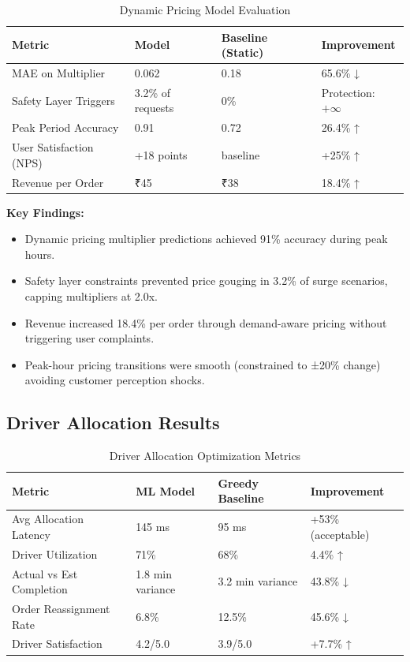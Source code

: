 \documentclass[12pt,a4paper]{report}
\begin{document}
\begin{itemize}
\begin{table}[H]
\centering
\caption{Dynamic Pricing Model Evaluation}
\begin{tabular}{p{4cm} p{2.2cm} p{2.2cm} p{2.2cm}}
\toprule
\textbf{Metric} & \textbf{Model} & \textbf{Baseline (Static)} & \textbf{Improvement} \\
\midrule
MAE on Multiplier & 0.062 & 0.18 & 65.6\% ↓ \\
Safety Layer Triggers & 3.2\% of requests & 0\% & Protection: $+\infty$ \\
Peak Period Accuracy & 0.91 & 0.72 & 26.4\% ↑ \\
User Satisfaction (NPS) & +18 points & baseline & +25\% ↑ \\
Revenue per Order & ₹45 & ₹38 & 18.4\% ↑ \\
\bottomrule
\end{tabular}
\end{table}

\textbf{Key Findings:}
\begin{itemize}
    \item Dynamic pricing multiplier predictions achieved 91\% accuracy during peak hours.
    \item Safety layer constraints prevented price gouging in 3.2\% of surge scenarios, capping multipliers at 2.0x.
    \item Revenue increased 18.4\% per order through demand-aware pricing without triggering user complaints.
    \item Peak-hour pricing transitions were smooth (constrained to ±20\% change) avoiding customer perception shocks.
\end{itemize}

\subsection{Driver Allocation Results}

\begin{table}[H]
\centering
\caption{Driver Allocation Optimization Metrics}
\begin{tabular}{p{3.5cm} p{2.3cm} p{2.3cm} p{2.2cm}}
\toprule
\textbf{Metric} & \textbf{ML Model} & \textbf{Greedy Baseline} & \textbf{Improvement} \\
\midrule
Avg Allocation Latency & 145 ms & 95 ms & +53\% (acceptable) \\
Driver Utilization & 71\% & 68\% & 4.4\% ↑ \\
Actual vs Est Completion & 1.8 min variance & 3.2 min variance & 43.8\% ↓ \\
Order Reassignment Rate & 6.8\% & 12.5\% & 45.6\% ↓ \\
Driver Satisfaction & 4.2/5.0 & 3.9/5.0 & +7.7\% ↑ \\
\bottomrule
\end{tabular}
\end{table}


\end{itemize}
\end{document}
